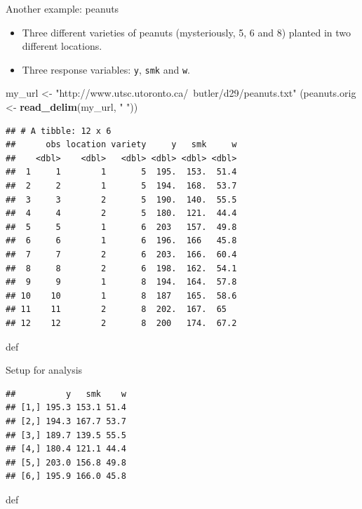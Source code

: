 \documentclass[ignorenonframetext,]{beamer}
\newenvironment{Shaded}{\begin{snugshade}}{\end{snugshade}}
\newcommand{\DataTypeTok}[1]{\textcolor[rgb]{0.13,0.29,0.53}{#1}}
\newcommand{\KeywordTok}[1]{\textcolor[rgb]{0.13,0.29,0.53}{\textbf{#1}}}
\newcommand{\NormalTok}[1]{#1}
\newcommand{\OperatorTok}[1]{\textcolor[rgb]{0.81,0.36,0.00}{\textbf{#1}}}
\newcommand{\StringTok}[1]{\textcolor[rgb]{0.31,0.60,0.02}{#1}}
\begin{document}
\begin{frame}[fragile]{Another example: peanuts}
\protect\hypertarget{another-example-peanuts}{}

\begin{itemize}
\item
  Three different varieties of peanuts (mysteriously, 5, 6 and 8)
  planted in two different locations.
\item
  Three response variables: \texttt{y}, \texttt{smk} and \texttt{w}.
\end{itemize}

\begin{Shaded}
\begin{Highlighting}[]
\NormalTok{my_url <-}\StringTok{ "http://www.utsc.utoronto.ca/~butler/d29/peanuts.txt"}
\NormalTok{(peanuts.orig <-}\StringTok{ }\KeywordTok{read_delim}\NormalTok{(my_url, }\StringTok{" "}\NormalTok{))}
\end{Highlighting}
\end{Shaded}

\begin{verbatim}
## # A tibble: 12 x 6
##      obs location variety     y   smk     w
##    <dbl>    <dbl>   <dbl> <dbl> <dbl> <dbl>
##  1     1        1       5  195.  153.  51.4
##  2     2        1       5  194.  168.  53.7
##  3     3        2       5  190.  140.  55.5
##  4     4        2       5  180.  121.  44.4
##  5     5        1       6  203   157.  49.8
##  6     6        1       6  196.  166   45.8
##  7     7        2       6  203.  166.  60.4
##  8     8        2       6  198.  162.  54.1
##  9     9        1       8  194.  164.  57.8
## 10    10        1       8  187   165.  58.6
## 11    11        2       8  202.  167.  65  
## 12    12        2       8  200   174.  67.2
\end{verbatim}

def

\end{frame}

\begin{frame}[fragile]{Setup for analysis}
\protect\hypertarget{setup-for-analysis}{}

\begin{Shaded}
\end{Shaded}

\begin{verbatim}
##          y   smk    w
## [1,] 195.3 153.1 51.4
## [2,] 194.3 167.7 53.7
## [3,] 189.7 139.5 55.5
## [4,] 180.4 121.1 44.4
## [5,] 203.0 156.8 49.8
## [6,] 195.9 166.0 45.8
\end{verbatim}

def

\end{frame}
\end{document}
